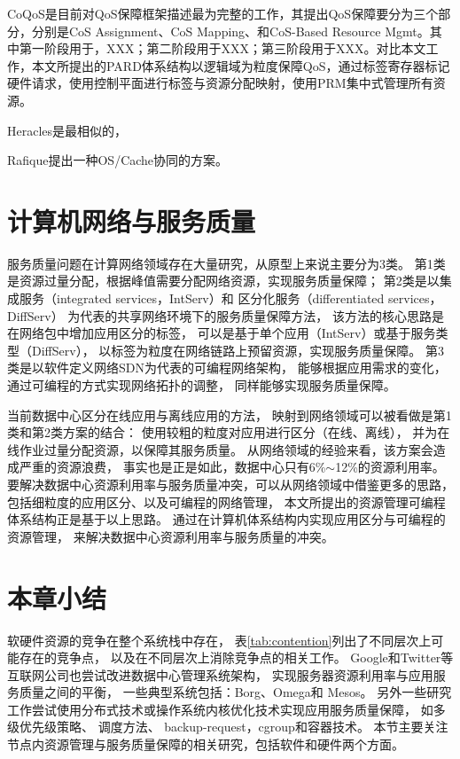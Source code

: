 CoQoS是目前对QoS保障框架描述最为完整的工作，其提出QoS保障要分为三个部分，分别是CoS Assignment、CoS Mapping、和CoS-Based Resource Mgmt。其中第一阶段用于，XXX；第二阶段用于XXX；第三阶段用于XXX。对比本文工作，本文所提出的PARD体系结构以逻辑域为粒度保障QoS，通过标签寄存器标记硬件请求，使用控制平面进行标签与资源分配映射，使用PRM集中式管理所有资源。

Heracles是最相似的，

Rafique提出一种OS/Cache协同的方案。


\section{计算机网络与服务质量}
\label{sec:background:sdn}

服务质量问题在计算网络领域存在大量研究，从原型上来说主要分为3类。
第1类是资源过量分配，根据峰值需要分配网络资源，实现服务质量保障；
第2类是以集成服务（integrated services，IntServ）\cite{IntServ}和
区分化服务（differentiated services，DiffServ）\cite{DiffServ}
为代表的共享网络环境下的服务质量保障方法，
该方法的核心思路是在网络包中增加应用区分的标签，
可以是基于单个应用（IntServ）或基于服务类型（DiffServ），
以标签为粒度在网络链路上预留资源，实现服务质量保障。
第3类是以软件定义网络SDN\cite{SDN}为代表的可编程网络架构，
能够根据应用需求的变化，通过可编程的方式实现网络拓扑的调整，
同样能够实现服务质量保障。

当前数据中心区分在线应用与离线应用的方法，
映射到网络领域可以被看做是第1类和第2类方案的结合：
使用较粗的粒度对应用进行区分（在线、离线），
并为在线作业过量分配资源，以保障其服务质量。
从网络领域的经验来看，该方案会造成严重的资源浪费，
事实也是正是如此，数据中心只有6\%$\sim$12\%的资源利用率。
要解决数据中心资源利用率与服务质量冲突，可以从网络领域中借鉴更多的思路，
包括细粒度的应用区分、以及可编程的网络管理，
本文所提出的资源管理可编程体系结构正是基于以上思路。
通过在计算机体系结构内实现应用区分与可编程的资源管理，
来解决数据中心资源利用率与服务质量的冲突。



\section{本章小结}

软硬件资源的竞争在整个系统栈中存在，
表\ref{tab:contention}列出了不同层次上可能存在的竞争点，
以及在不同层次上消除竞争点的相关工作。
Google和Twitter等互联网公司也尝试改进数据中心管理系统架构，
实现服务器资源利用率与应用服务质量之间的平衡，
一些典型系统包括：Borg\cite{borg:2015}、Omega\cite{Schwarzkopf_omega_2013}和
Mesos\cite{Hindman:2011:Mesos}。
另外一些研究工作尝试使用分布式技术或操作系统内核优化技术实现应用服务质量保障，
如多级优先级策略\cite{Reiss_googletrace_2012}、
调度方法\cite{delimitrou_paragon:_2013, delimitrou_quasar:_2014, mars_heterogeneity_2011,
kozyrakis_reconciling_2014, Novakovi:ATC2013}、
backup-request\cite{dean_tail_2013}，cgroup\cite{cgroup}和容器技术\cite{lxc}。 
本节主要关注节点内资源管理与服务质量保障的相关研究，包括软件和硬件两个方面。

